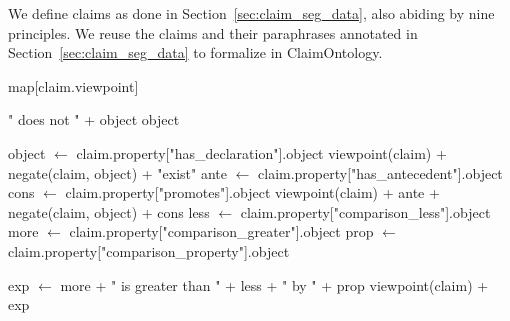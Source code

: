 We define claims as done in Section~\ref{sec:claim_seg_data}, also 
abiding by nine principles. We reuse the claims and their paraphrases 
annotated in Section~\ref{sec:claim_seg_data} to formalize in ClaimOntology. 

\begin{algorithm}[t]
	\footnotesize{
	\begin{algorithmic}[1]

\State {}

	\State 
	\Return map[claim.viewpoint]
	\State
\EndFunction
\State

\State
\Return " does not " + object
\Else
\State
\Return object
\EndIf

\EndFunction
\State

	\State object $\gets$ claim.property["has\_declaration"].object
	\State
	\Return viewpoint(claim) + negate(claim, object) + "exist"
\EndIf
\State
{}
	\State ante $\gets$ claim.property["has\_antecedent"].object
	\State cons $\gets$ claim.property["promotes"].object
	\State
	\Return viewpoint(claim) + ante + negate(claim, object) + cons
\EndIf
\State
{}
	\State less $\gets$ claim.property["comparison\_less"].object
	\State more $\gets$ claim.property["comparison\_greater"].object
	\State prop $\gets$ claim.property["comparison\_property"].object
	\State

	\State exp $\gets$ more + " is greater than " + less + " by " + prop
	\State
	\Return viewpoint(claim) + exp
\EndIf
\end{algorithmic}



}
\end{algorithm}
